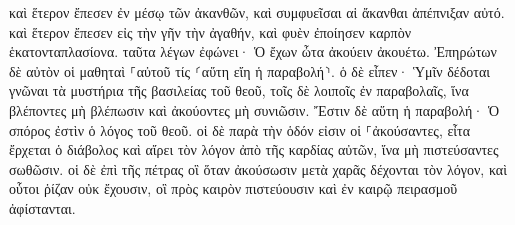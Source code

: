 \documentclass{openreader}
\begin{document}
καὶ ἕτερον ἔπεσεν ἐν μέσῳ τῶν ἀκανθῶν, καὶ συμφυεῖσαι αἱ ἄκανθαι ἀπέπνιξαν αὐτό. 
καὶ ἕτερον ἔπεσεν εἰς τὴν γῆν τὴν ἀγαθήν, καὶ φυὲν ἐποίησεν καρπὸν ἑκατονταπλασίονα. ταῦτα λέγων ἐφώνει· Ὁ ἔχων ὦτα ἀκούειν ἀκουέτω. 
Ἐπηρώτων δὲ αὐτὸν οἱ μαθηταὶ ⸀αὐτοῦ τίς ⸂αὕτη εἴη ἡ παραβολή⸃. 
ὁ δὲ εἶπεν· Ὑμῖν δέδοται γνῶναι τὰ μυστήρια τῆς βασιλείας τοῦ θεοῦ, τοῖς δὲ λοιποῖς ἐν παραβολαῖς, ἵνα βλέποντες μὴ βλέπωσιν καὶ ἀκούοντες μὴ συνιῶσιν. 
Ἔστιν δὲ αὕτη ἡ παραβολή· Ὁ σπόρος ἐστὶν ὁ λόγος τοῦ θεοῦ. 
οἱ δὲ παρὰ τὴν ὁδόν εἰσιν οἱ ⸀ἀκούσαντες, εἶτα ἔρχεται ὁ διάβολος καὶ αἴρει τὸν λόγον ἀπὸ τῆς καρδίας αὐτῶν, ἵνα μὴ πιστεύσαντες σωθῶσιν. 
οἱ δὲ ἐπὶ τῆς πέτρας οἳ ὅταν ἀκούσωσιν μετὰ χαρᾶς δέχονται τὸν λόγον, καὶ οὗτοι ῥίζαν οὐκ ἔχουσιν, οἳ πρὸς καιρὸν πιστεύουσιν καὶ ἐν καιρῷ πειρασμοῦ ἀφίστανται. 
\end{document}
